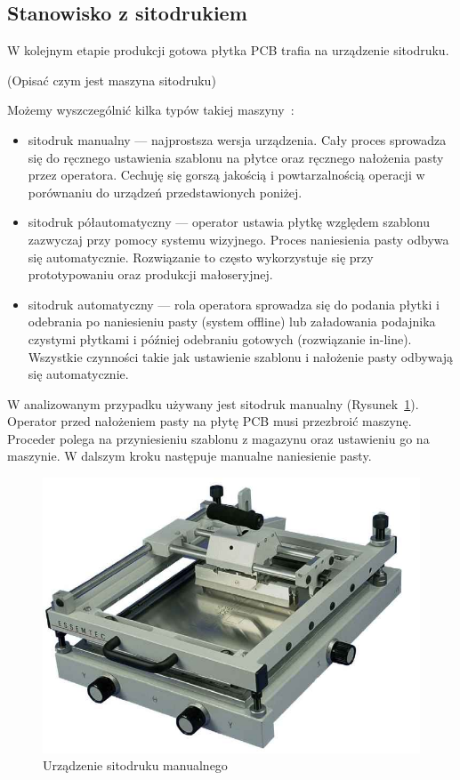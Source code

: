 \subsection{Stanowisko z sitodrukiem}
W kolejnym etapie produkcji gotowa płytka PCB trafia na urządzenie sitodruku.

(Opisać czym jest maszyna sitodruku)

Możemy wyszczególnić kilka typów takiej maszyny~\cite{sitodruk}:
\begin{itemize}
	\item sitodruk manualny --- najprostsza wersja urządzenia. Cały proces sprowadza się do ręcznego ustawienia szablonu na płytce oraz ręcznego nałożenia pasty przez operatora. Cechuję się gorszą jakością i powtarzalnością operacji w porównaniu do urządzeń przedstawionych poniżej.
	\item sitodruk półautomatyczny --- operator ustawia płytkę względem szablonu zazwyczaj przy pomocy systemu wizyjnego. Proces naniesienia pasty odbywa się automatycznie. Rozwiązanie to często wykorzystuje się przy prototypowaniu oraz produkcji małoseryjnej.
	\item sitodruk automatyczny --- rola operatora sprowadza się do podania płytki i odebrania po naniesieniu pasty (system offline) lub załadowania podajnika czystymi płytkami i później odebraniu gotowych (rozwiązanie in-line). Wszystkie czynności takie jak ustawienie szablonu i nałożenie pasty odbywają się automatycznie.
\end{itemize}

W analizowanym przypadku używany jest sitodruk manualny (Rysunek~\ref{sitodruk}). Operator przed nałożeniem pasty na płytę PCB musi przezbroić maszynę. Proceder polega na przyniesieniu szablonu z magazynu oraz ustawieniu go na maszynie. W dalszym kroku następuje manualne naniesienie pasty.

\begin{figure}[H]
	\centering
	\includegraphics[scale=0.25]{./chapters/chapter2/sitodruk.jpg}
	\caption{Urządzenie sitodruku manualnego~\cite{sitodruk}}
	\label{sitodruk}
\end{figure}

